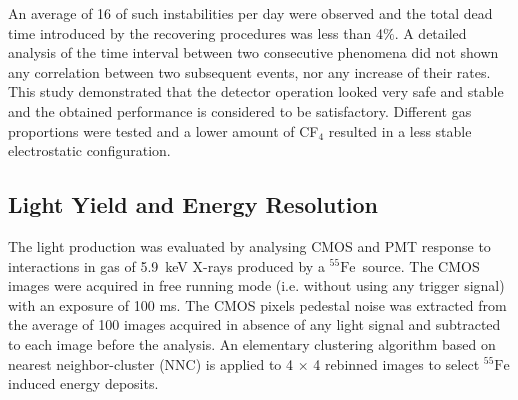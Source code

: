 \documentclass[physics,article,submit,moreauthors,pdftex]{Definitions/mdpi}
\newcommand{\fe}{\ensuremath{^{55}\textrm{Fe}}\xspace}
\begin{document}
An average of 16 of such instabilities per day were observed and the total dead time introduced by the recovering procedures was less than 4$\%$. A detailed analysis of the time interval between two consecutive phenomena did not shown any correlation between two subsequent events, nor any increase of their rates. This study demonstrated that the detector operation looked very safe and stable and the obtained performance is considered to be satisfactory. Different gas proportions were tested and a lower amount of CF$_4$ resulted in a less stable electrostatic configuration. 





\subsection{Light Yield and Energy Resolution}\label{sec:yield}

The light production was evaluated by analysing CMOS and PMT response to interactions in gas of 5.9~keV X-rays produced by a \fe~source. The CMOS images were acquired in free running mode (i.e. without using any trigger signal) with an exposure of 100 ms. The CMOS pixels pedestal noise was extracted from the average of 100 images acquired in absence of any light signal and subtracted to each image before the analysis. An elementary clustering algorithm based on nearest neighbor-cluster (NNC) is applied to 4 $\times$ 4 rebinned images to select \fe\-induced energy deposits.
\end{document}
